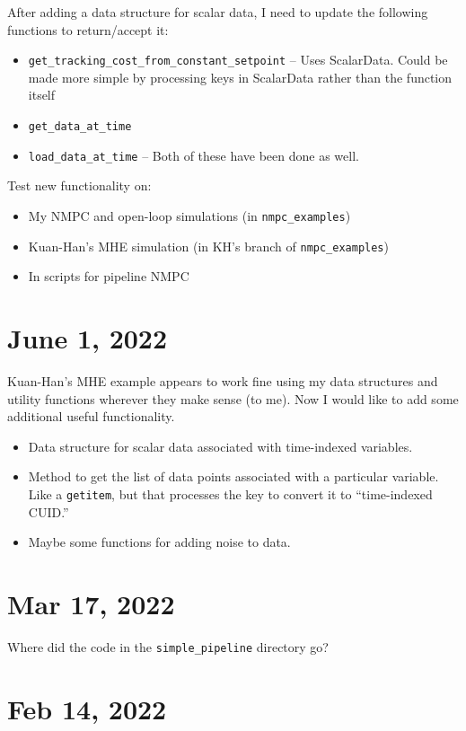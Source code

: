 \documentclass{article}
\begin{document}
After adding a data structure for scalar data, I need to update
the following functions to return/accept it:
\begin{itemize}
  \item \texttt{get\_tracking\_cost\_from\_constant\_setpoint}
    -- Uses ScalarData. Could be made more simple by processing keys
    in ScalarData rather than the function itself
  \item \texttt{get\_data\_at\_time}
  \item \texttt{load\_data\_at\_time}
    -- Both of these have been done as well.
\end{itemize}

Test new functionality on:
\begin{itemize}
  \item My NMPC and open-loop simulations (in \texttt{nmpc\_examples})
  \item Kuan-Han's MHE simulation (in KH's branch of \texttt{nmpc\_examples})
  \item In scripts for pipeline NMPC
\end{itemize}

\section{June 1, 2022}

Kuan-Han's MHE example appears to work fine using my data structures
and utility functions wherever they make sense (to me).
Now I would like to add some additional useful functionality.
\begin{itemize}
  \item Data structure for scalar data associated with time-indexed variables.
  \item Method to get the list of data points associated with a particular
    variable. Like a \texttt{getitem}, but that processes the key to convert
    it to ``time-indexed CUID.''
  \item Maybe some functions for adding noise to data.
\end{itemize}

\section{Mar 17, 2022}

Where did the code in the \texttt{simple\_pipeline} directory go?

\section{Feb 14, 2022}
\end{document}
